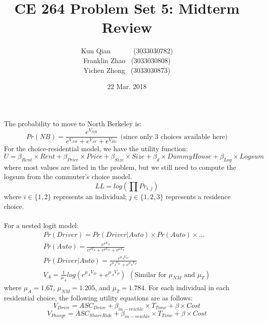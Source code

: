 \documentclass[11pt]{article}
\title{CE 264 Problem Set 5: Midterm Review}
\date{22 Mar. 2018}
\author{Kun Qian \ \ \ \ \ \ (3033030782)\\ Franklin Zhao \ (3033030808)\\ Yichen Zhong \  (3033030873)}
\begin{document}
	
	\maketitle
	\renewcommand\theequation{\arabic{equation}}
	\renewcommand{\figurename}{Fig.}
	\renewcommand\thesection{Problem \arabic{section}}
	\renewcommand\thesubsection{(\Alph{subsection})}
	\renewcommand\thesubsubsection{Question (\alph{subsubsection}):}
	\onehalfspacing	
	
\section{}
\noindent The probability to move to North Berkeley is:
\begin{equation}\label{finaleq}
Pr(NB)=\frac{e^{V_{NB}}}{e^{V_{NB}}+e^{V_{SF}}+e^{V_{PO}}}\ \ \text{(since only 3 choices available here)}
\end{equation}
\noindent For the choice-residential model, we have the utility function:
\begin{equation}
U=\beta_{Rent}\times Rent+\beta_{Price}\times Price+\beta_{Size}\times Size+\beta_d\times DummyHouse+\beta_{Log}\times Logsum
\end{equation}
where most values are listed in the problem, but we still need to compute the logsum from the commuter's choice model.
\begin{equation}
LL=log(\prod Pr_{i,j})
\end{equation}
where $i\in\{1,2\}$ represents an individual; $j\in\{1,2,3\}$ represents a residence choice.\\\\
For a nested logit model:
\begin{align}
Pr(Driver)=Pr(Driver|Auto)\times Pr(Auto)\times...\\
Pr(Auto)=\frac{e^{\mu V_A}}{e^{\mu V_A}+e^{\mu V_N}+e^{\mu V_T}}\\ Pr(Driver|Auto)=\frac{e^{\mu_AV_D}}{e^{\mu_AV_D}+e^{\mu_AV_P}}\\
V_A=\frac{1}{\mu_A}log(e^{\mu_AV_D}+e^{\mu_AV_P})\ \ (\text{Similar for }\mu_{NM}\text{ and } \mu_T)
\end{align}
where $\mu_A=1.67$, $\mu_{NM}=1.205$, and $\mu_T=1.784$.
For each individual in each residential choice, the following utility equations are as follows:
\begin{equation}
V_{Drive}=ASC_{Drive}+\beta_{in-veichle}\times T_{Time}+\beta\times Cost
\end{equation}
\begin{equation}
V_{Passgr}=ASC_{ShareRide}+\beta_{in-veichle}\times T_{Time}+\beta\times Cost
\end{equation}	
\end{document}
